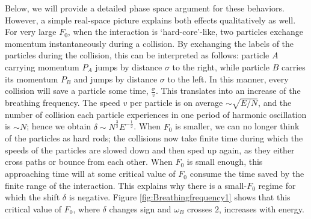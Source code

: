 \documentclass[a4paper, onecolumn]{revtex4-1}
\begin{document}
Below, we will provide a detailed phase space argument for these behaviors.  However, a simple
real-space picture explains both effects qualitatively as well.  For very large $F_0$, when the
interaction is `hard-core'-like, two particles exchange momentum instantaneously during a collision.
By exchanging the labels of the particles during the collision, this can be interpreted as follows:
particle $A$ carrying momentum $P_A$ jumps by distance $\sigma$ to the right, while particle $B$
carries its momentum $P_B$ and jumps by distance $\sigma$ to the left.  In this manner, every
collision will save a particle some time, $\frac{\sigma}{v}$.  This translates into an increase of
the breathing frequency.  The speed $v$ per particle is on average $\sim\sqrt{E/N}$, and the number
of collision each particle experiences in one period of harmonic oscillation is $\sim N$; hence we
obtain $\delta\sim N^{\frac{3}{2}}E^{-\frac{1}{2}}$.  When $F_0$ is smaller, we can no longer think
of the particles as hard rods; the collisions now take finite time during which the speeds of the
particles are slowed down and then sped up again, as they either cross paths or bounce from each
other.  When $F_0$ is small enough, this approaching time will at some critical value of $F_0$
consume the time saved by the finite range of the interaction.  This explains why there is a
small-$F_0$ regime for which the shift $\delta$ is negative.  Figure \ref{fig:Breathingfrequency1}
shows that this critical value of $F_0$, where $\delta$ changes sign and $\omega_B$ crosses $2$,
increases with energy.
\end{document}
